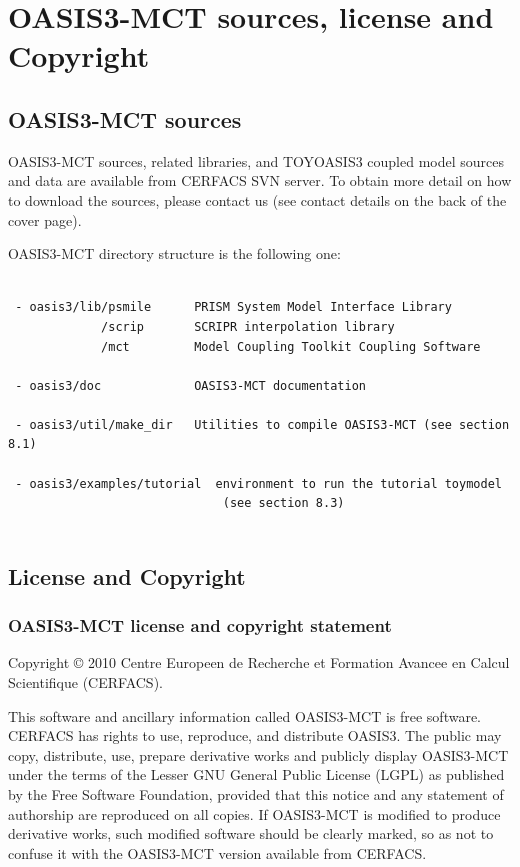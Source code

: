 \newpage
\chapter{OASIS3-MCT sources, license and Copyright}
\label{sec_Obtaining}
%
%
\section{OASIS3-MCT sources}
OASIS3-MCT sources, related libraries, and TOYOASIS3
coupled model sources and data are available from CERFACS SVN server. To obtain more detail on how to download
the sources, please
contact us (see contact details on the back of the cover page).

OASIS3-MCT directory structure is the following one:

\begin{verbatim}

 - oasis3/lib/psmile      PRISM System Model Interface Library
             /scrip       SCRIPR interpolation library
             /mct         Model Coupling Toolkit Coupling Software
                  
 - oasis3/doc             OASIS3-MCT documentation
 
 - oasis3/util/make_dir   Utilities to compile OASIS3-MCT (see section 8.1) 

 - oasis3/examples/tutorial  environment to run the tutorial toymodel
                              (see section 8.3)
 
\end{verbatim}
%                              
% 
%

\section{License and Copyright}

\subsection{OASIS3-MCT license and copyright statement}

Copyright © 2010 Centre Europeen de Recherche et Formation
Avancee en Calcul Scientifique (CERFACS).  

This software and ancillary information called OASIS3-MCT is free
software.  CERFACS has rights to use, reproduce, and distribute
OASIS3. The public may copy, distribute, use, prepare derivative works and
publicly display OASIS3-MCT under the terms of the Lesser GNU General
Public License (LGPL) as published by the Free Software Foundation,
provided that this notice and any statement of authorship are
reproduced on all copies. If OASIS3-MCT is modified to produce derivative
works, such modified software should be clearly marked, so as not to
confuse it with the OASIS3-MCT version available from CERFACS.

